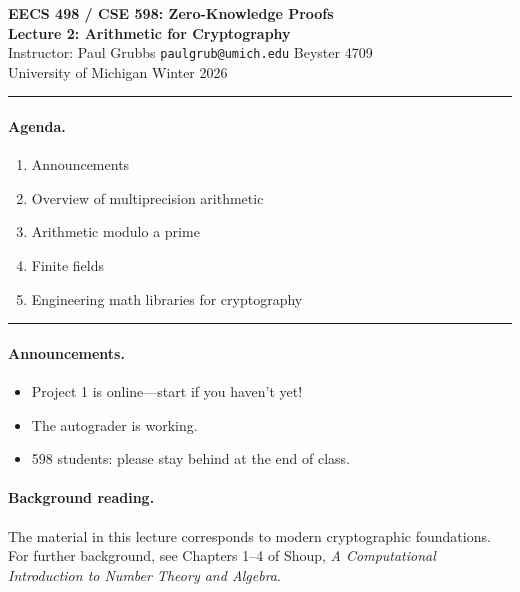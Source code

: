 \documentclass[11pt]{article}
\theoremstyle{plain}
\theoremstyle{definition}
\begin{document}

\begin{center}
  {\Large \textbf{EECS 498 / CSE 598: Zero-Knowledge Proofs}} \\[4pt]
  {\large \textbf{Lecture 2: Arithmetic for Cryptography}} \\[4pt]
  {\normalsize Instructor: Paul Grubbs \quad
   \texttt{paulgrub@umich.edu} \quad Beyster 4709} \\[2pt]
  {\normalsize University of Michigan \quad Winter 2026}
\end{center}

\medskip
\hrule
\medskip

\paragraph{Agenda.}
\begin{enumerate}[label=(\arabic*)]
  \item Announcements
  \item Overview of multiprecision arithmetic
  \item Arithmetic modulo a prime
  \item Finite fields
  \item Engineering math libraries for cryptography
\end{enumerate}

\medskip
\hrule
\medskip

\paragraph{Announcements.}
\begin{itemize}
  \item Project 1 is online---start if you haven't yet!
  \item The autograder is working.
  \item 598 students: please stay behind at the end of class.
\end{itemize}

\paragraph{Background reading.}
The material in this lecture corresponds to modern cryptographic
foundations.  For further background, see Chapters 1--4 of Shoup,
\emph{A Computational Introduction to Number Theory and Algebra}.
\end{document}
